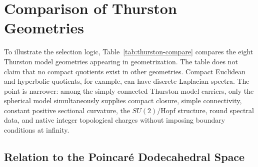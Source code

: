 \documentclass[aps,prd,onecolumn,superscriptaddress,longbibliography,nofootinbib,notitlepage]{revtex4-2}
\renewcommand{\arraystretch}{1.17}
\begin{document}
\section{Comparison of Thurston Geometries}
\label{sec:thurston-comparison}

To illustrate the selection logic, Table~\ref{tab:thurston-compare} compares the
eight Thurston model geometries appearing in geometrization. The table does not
claim that no compact quotients exist in other geometries. Compact Euclidean and
hyperbolic quotients, for example, can have discrete Laplacian spectra. The point
is narrower: among the simply connected Thurston model carriers, only the
spherical model simultaneously supplies compact closure, simple connectivity,
constant positive sectional curvature, the $SU(2)$/Hopf structure, round spectral
data, and native integer topological charges without imposing boundary conditions
at infinity.
\begin{table}[htbp]
\centering
\caption{\label{tab:thurston-compare}Thurston model geometries under the invariant bundle used in this reconstruction. Compact quotients of other model geometries may have discrete spectra, but they are not simply connected model carriers.}
\scriptsize
\renewcommand{\arraystretch}{1.12}
\end{table}

\subsection{Relation to the Poincar\'e Dodecahedral Space}
\label{sec:pds-comparison}
\end{document}
